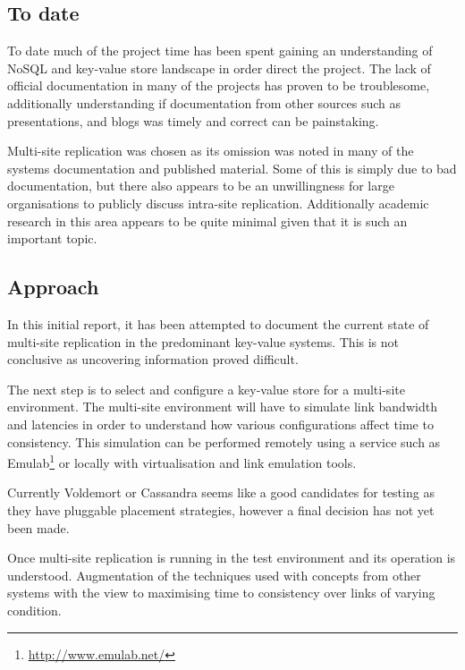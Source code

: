 \subsection{To date}
To date much of the project time has been spent gaining an understanding of NoSQL and key-value store landscape in order direct the project. The lack of official documentation in many of the projects has proven to be troublesome, additionally understanding if documentation from other sources such as presentations, and blogs was timely and correct can be painstaking.

Multi-site replication was chosen as its omission was noted in many of the systems documentation and published material. Some of this is simply due to bad documentation, but there also appears to be an unwillingness for large organisations to publicly discuss intra-site replication. Additionally academic research in this area appears to be quite minimal given that it is such an important topic.

\subsection{Approach}
In this initial report, it has been attempted to document the current state of multi-site replication in the predominant key-value systems. This is not conclusive as uncovering information proved difficult.

The next step is to select and configure a key-value store for a multi-site environment. The multi-site environment will have to simulate link bandwidth and latencies in order to understand how various configurations affect time to consistency. This simulation can be performed remotely using a service such as Emulab\footnote{\url{http://www.emulab.net/}} or locally with virtualisation and link emulation tools.

Currently Voldemort or Cassandra seems like a good candidates for testing as they have pluggable placement strategies, however a final decision has not yet been made.

Once multi-site replication is running in the test environment and its operation is understood. Augmentation of the techniques used with concepts from other systems with the view to maximising time to consistency over links of varying condition.

